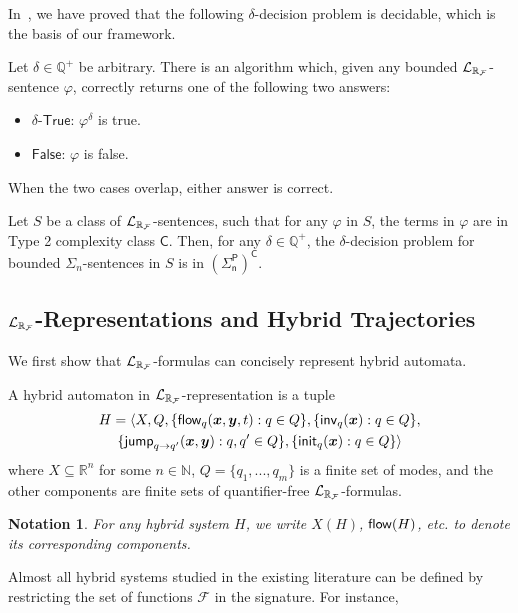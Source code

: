 \documentclass[12pt]{llncs}
\newtheorem{notation}[theorem]{Notation}
\begin{document}
In~\cite{DBLP:conf/lics/GaoAC12,DBLP:conf/cade/GaoAC12}, we have proved that the following $\delta$-decision problem is decidable, which is the basis of our framework.
\begin{theorem}\label{delta-decide} Let $\delta\in\mathbb{Q}^+$ be
arbitrary. There is an algorithm which, given any bounded $\mathcal{L}_{\mathbb{R}_{\mathcal{F}}}$-sentence $\varphi$,
correctly returns one of the following two answers:
\begin{itemize}
\item $\delta$-$\mathsf{True}$: $\varphi^{\delta}$ is true.
\item $\mathsf{False}$: $\varphi$ is false.
\end{itemize}
When the two cases overlap, either answer is correct.
\end{theorem}
\begin{theorem}[Complexity]\label{compmain}
Let $S$ be a class of $\mathcal{L}_{\mathbb{R}_{\mathcal{F}}}$-sentences, such that for any $\varphi$ in $S$, the terms in $\varphi$ are in Type 2 complexity class $\mathsf{C}$. Then, for any $\delta\in \mathbb{Q}^+$, the $\delta$-decision problem for bounded $\Sigma_n$-sentences in $S$ is in $\mathsf{(\Sigma_n^P)^C}$.
\end{theorem}
\subsection{{\large$\mathcal{L}_{\mathbb{R}_{\mathcal{F}}}$}-Representations and Hybrid Trajectories}\label{language}
We first show that $\mathcal{L}_{\mathbb{R}_{\mathcal{F}}}$-formulas can concisely represent hybrid automata.
\begin{definition}\label{lrf-definition}
A hybrid automaton in $\mathcal{L}_{\mathbb{R}_{\mathcal{F}}}$-representation is a tuple
\begin{multline*}
H = \langle X, Q, \{{\flow}_q(\vec x, \vec y, t): q\in Q\},\{\inv_q(\vec x): q\in Q\},\\
\{\jump_{q\rightarrow q'}(\vec x, \vec y): q,q'\in Q\},\{\init_q(\vec x): q\in Q\}\rangle
\end{multline*}
where $X\subseteq \mathbb{R}^n$ for some $n\in \mathbb{N}$, $Q=\{q_1,...,q_m\}$ is a finite set of modes, and the other components are finite sets of quantifier-free $\mathcal{L}_{\mathbb{R}_{\mathcal{F}}}$-formulas.
\end{definition}
\begin{notation}
For any hybrid system $H$, we write $X(H)$, $\mathsf{flow}(H)$, etc. to denote its corresponding components.
\end{notation}
Almost all hybrid systems studied in the existing literature can be defined by restricting the set of functions $\mathcal{F}$ in the signature. For instance,
\end{document}
